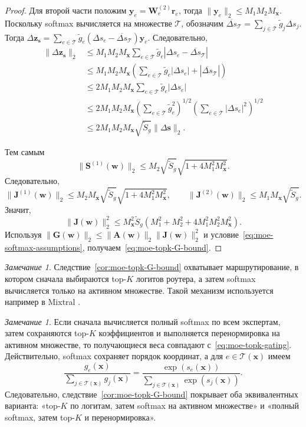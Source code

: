 \documentclass[11pt]{extarticle}
\theoremstyle{definition}
\newcounter{theoremchild}[theorem]
\theoremstyle{plain}
\theoremstyle{remark}
\newtheorem{remark}[theoremchild]{Замечание}
\begin{document}
\begin{proof}
Для второй части положим
$
\mathbf y_e=\mathbf W_e^{(2)}\mathbf r_e
$,
тогда
$
\|\mathbf y_e\|_2\le M_1M_2M_{\mathbf x}.
$
Поскольку softmax вычисляется на множестве $\mathcal T$, обозначим
$
\overline{\Delta s}_{\mathcal T}
=
\sum\limits_{j\in\mathcal T}\tilde g_j\Delta s_j.
$
Тогда
$
\Delta\mathbf z_{\mathbf s}
=
\sum\limits_{e\in\mathcal T}
\tilde g_e
\left(
\Delta s_e-\overline{\Delta s}_{\mathcal T}
\right)
\mathbf y_e.
$
Следовательно,
$$
\begin{aligned}
\|\Delta\mathbf z_{\mathbf s}\|_2
&\le
M_1M_2M_{\mathbf x}
\sum\limits_{e\in\mathcal T}
\tilde g_e
\left|
\Delta s_e-\overline{\Delta s}_{\mathcal T}
\right| \\
&\le
M_1M_2M_{\mathbf x}
\left(
\sum\limits_{e\in\mathcal T}
\tilde g_e|\Delta s_e|
+
|\overline{\Delta s}_{\mathcal T}|
\right) \\
&\le
2M_1M_2M_{\mathbf x}
\sum\limits_{e\in\mathcal T}
\tilde g_e|\Delta s_e| \\
&\le
2M_1M_2M_{\mathbf x}
\left(
\sum\limits_{e\in\mathcal T}\tilde g_e^2
\right)^{1/2}
\left(
\sum\limits_{e\in\mathcal T}|\Delta s_e|^2
\right)^{1/2} \\
&\le
2M_1M_2M_{\mathbf x}
\sqrt{\tilde S_g}\|\Delta\mathbf s\|_2.
\end{aligned}
$$

Тем самым
$$
\|\mathbf S^{(1)}(\mathbf w)\|_2
\le
M_2\sqrt{\tilde S_g}
\sqrt{1+4M_1^2M_{\mathbf x}^2}.
$$
Следовательно,
$$
\|\mathbf J^{(1)}(\mathbf w)\|_2
\le
M_2M_{\mathbf x}\sqrt{\tilde S_g}
\sqrt{1+4M_1^2M_{\mathbf x}^2},
\qquad
\|\mathbf J^{(2)}(\mathbf w)\|_2
\le
M_1M_{\mathbf x}\sqrt{\tilde S_g}.
$$
Значит,
$$
\|\mathbf J(\mathbf w)\|_2^2
\le
M_{\mathbf x}^2\tilde S_g
\left(
M_1^2+M_2^2+4M_1^2M_2^2M_{\mathbf x}^2
\right).
$$
Используя
$
\|\mathbf G(\mathbf w)\|_2
\le
\|\mathbf A(\mathbf w)\|_2\|\mathbf J(\mathbf w)\|_2^2
$
и условие~\eqref{eq:moe-softmax-assumptions}, получаем~\eqref{eq:moe-topk-G-bound}.
\end{proof}

\begin{remark}
Следствие~\ref{cor:moe-topk-G-bound} охватывает маршрутирование, в котором сначала выбираются top-$K$ логитов роутера, а затем softmax вычисляется только на активном множестве. Такой механизм используется например в Mixtral \cite{Mixtral2024}.
\end{remark}

\begin{remark}
Если сначала вычисляется полный softmax по всем экспертам, затем сохраняются top-$K$ коэффициентов и выполняется перенормировка на активном множестве, то получающиеся веса совпадают с~\eqref{eq:moe-topk-gating}. Действительно, softmax сохраняет порядок координат, а для $e\in\mathcal T(\mathbf x)$ имеем
$$
\frac{g_e(\mathbf x)}{\sum\limits_{j\in\mathcal T(\mathbf x)}g_j(\mathbf x)}
=
\frac{\exp(s_e(\mathbf x))}{\sum\limits_{j\in\mathcal T(\mathbf x)}\exp(s_j(\mathbf x))}.
$$
Следовательно, следствие~\ref{cor:moe-topk-G-bound} покрывает оба эквивалентных варианта:
«top-$K$ по логитам, затем softmax на активном множестве» и
«полный softmax, затем top-$K$ и перенормировка».
\end{remark}
\end{document}
